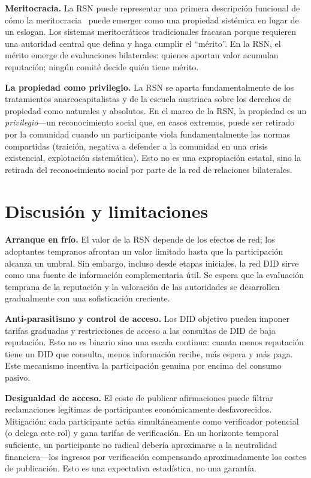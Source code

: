 \documentclass[11pt,a4paper,twocolumn]{article}
\begin{document}
\textbf{Meritocracia.} La RSN puede representar una primera descripción funcional de cómo la meritocracia~\cite{young1958} puede emerger como una propiedad sistémica en lugar de un eslogan. Los sistemas meritocráticos tradicionales fracasan porque requieren una autoridad central que defina y haga cumplir el ``mérito''. En la RSN, el mérito emerge de evaluaciones bilaterales: quienes aportan valor acumulan reputación; ningún comité decide quién tiene mérito.

\textbf{La propiedad como privilegio.} La RSN se aparta fundamentalmente de los tratamientos anarcocapitalistas y de la escuela austriaca sobre los derechos de propiedad como naturales y absolutos. En el marco de la RSN, la propiedad es un \emph{privilegio}---un reconocimiento social que, en casos extremos, puede ser retirado por la comunidad cuando un participante viola fundamentalmente las normas compartidas (traición, negativa a defender a la comunidad en una crisis existencial, explotación sistemática). Esto no es una expropiación estatal, sino la retirada del reconocimiento social por parte de la red de relaciones bilaterales.

\section{Discusión y limitaciones}

\textbf{Arranque en frío.} El valor de la RSN depende de los efectos de red; los adoptantes tempranos afrontan un valor limitado hasta que la participación alcanza un umbral. Sin embargo, incluso desde etapas iniciales, la red DID sirve como una fuente de información complementaria útil. Se espera que la evaluación temprana de la reputación y la valoración de las autoridades se desarrollen gradualmente con una sofisticación creciente.

\textbf{Anti-parasitismo y control de acceso.} Los DID objetivo pueden imponer tarifas graduadas y restricciones de acceso a las consultas de DID de baja reputación. Esto no es binario sino una escala continua: cuanta menos reputación tiene un DID que consulta, menos información recibe, más espera y más paga. Este mecanismo incentiva la participación genuina por encima del consumo pasivo.

\textbf{Desigualdad de acceso.} El coste de publicar afirmaciones puede filtrar reclamaciones legítimas de participantes económicamente desfavorecidos. Mitigación: cada participante actúa simultáneamente como verificador potencial (o delega este rol) y gana tarifas de verificación. En un horizonte temporal suficiente, un participante no radical debería aproximarse a la neutralidad financiera---los ingresos por verificación compensando aproximadamente los costes de publicación. Esto es una expectativa estadística, no una garantía.
\end{document}
